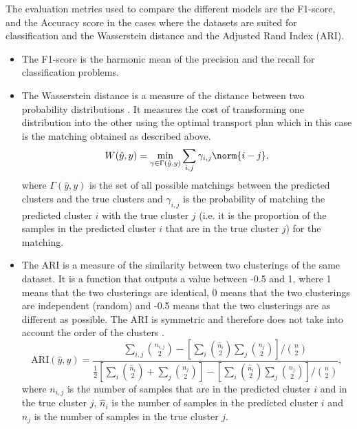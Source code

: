 The evaluation metrics used to compare the different models are the F1-score, and the Accuracy score in the cases where the datasets are suited for classification and the Wasserstein distance and the Adjusted Rand Index (ARI). %
\begin{itemize}
    \item The F1-score is the harmonic mean of the precision and the recall for classification problems.
    \item The Wasserstein distance is a measure of the distance between two probability distributions \citep{ramdas2017wasserstein}. 
        It measures the cost of transforming one distribution into the other using the optimal transport plan which in this case is the matching obtained as described above.
        \begin{equation}
            W(\hat{y}, y) = \min_{\gamma \in \Gamma(\hat{y}, y)} \sum_{i, j} \gamma_{i, j} \norm{i - j}
        ,\end{equation}
    where $\Gamma(\hat{y}, y)$ is the set of all possible matchings between the predicted clusters and the true clusters and $\gamma_{i, j}$ is the probability of matching the predicted cluster $i$ with the true cluster $j$ (i.e. it is the proportion of the samples in the predicted cluster $i$ that are in the true cluster $j$) for the matching.
\item The ARI is a measure of the similarity between two clusterings of the same dataset. It is a function that outputs a value between -0.5 and 1, where 1 means that the two clusterings are identical, 0 means that the two clusterings are independent (random) and -0.5 means that the two clusterings are as different as possible. The ARI is symmetric and therefore does not take into account the order of the clusters \citep{steinley2004properties}. 
    \begin{equation}
    \text{ARI}(\hat{y}, y) = \frac{\sum_{i, j} \binom{n_{i, j}}{2} - \left[\sum_i \binom{\hat{n}_i}{2} \sum_j \binom{n_j}{2}\right] / \binom{n}{2}}{\frac{1}{2} \left[\sum_i \binom{\hat{n}_i}{2} + \sum_j \binom{n_j}{2}\right] - \left[\sum_i \binom{\hat{n}_i}{2} \sum_j \binom{n_j}{2}\right] / \binom{n}{2}}
    ,\end{equation}
where $n_{i, j}$ is the number of samples that are in the predicted cluster $i$ and in the true cluster $j$, $\hat{n}_i$ is the number of samples in the predicted cluster $i$ and $n_j$ is the number of samples in the true cluster $j$.
\end{itemize}

